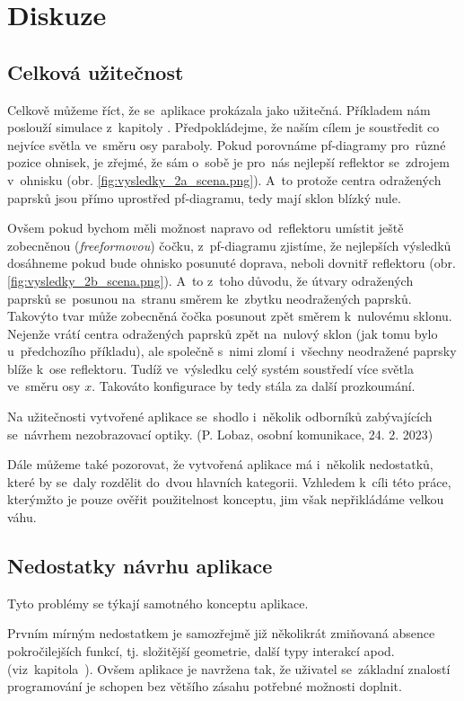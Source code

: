 \chapter{Diskuze}

\section{Celková užitečnost}

Celkově můžeme říct, že se~aplikace prokázala jako užitečná. Příkladem nám poslouží simulace z~kapitoly . Předpokládejme, že naším cílem je soustředit co nejvíce světla ve~směru osy paraboly. Pokud porovnáme pf-diagramy pro~rů\-zné pozice ohnisek, je zřejmé, že sám o~sobě je pro~nás nejlepší reflektor se~zdrojem v~ohnisku (obr. \ref{fig:vysledky_2a_scena.png}). A~to protože centra odražených paprsků jsou přímo uprostřed pf-diagramu, tedy mají sklon blízký nule.

Ovšem pokud bychom měli možnost napravo od~reflektoru umístit ještě zobecněnou (\emph{freeformovou}) čočku, z~pf-diagramu zjistíme, že nejlepších výsledků dosáhneme pokud bude ohnisko posunuté doprava, neboli dovnitř reflektoru (obr. \ref{fig:vysledky_2b_scena.png}). A~to z~toho důvodu, že útvary odražených paprsků se~posunou na~stranu směrem ke~zbytku neodražených paprsků. Takovýto tvar může zobecněná čočka posunout zpět směrem k~nulovému sklonu. Nejenže vrátí centra odražených paprsků zpět na~nulový sklon (jak tomu bylo u~předchozího příkladu), ale společně s~nimi zlomí i~všechny neodražené paprsky blíže k~ose reflektoru. Tudíž ve~výsledku celý systém soustředí více světla ve~směru osy $x$. Takováto konfigurace by tedy stála za další prozkoumání.

Na užitečnosti vytvořené aplikace se~shodlo i~několik odborníků zabývajících se~návrhem nezobrazovací optiky. (P. Lobaz, osobní komunikace, 24. 2. 2023)

Dále můžeme také pozorovat, že vytvořená aplikace má i~několik nedostatků, které by se~daly rozdělit do~dvou hlavních kategorii. Vzhledem k~cíli této práce, kterýmžto je pouze ověřit použitelnost konceptu, jim však nepřikládáme velkou váhu.

\section{Nedostatky návrhu aplikace}

Tyto problémy se týkají samotného konceptu aplikace.

Prvním mírným nedostatkem je samozřejmě již několikrát zmiňovaná absence pokročilejších funkcí, tj. složitější geometrie, další typy interakcí apod. (viz~kapitola~). Ovšem aplikace je navržena tak, že uživatel se~základní znalostí programování je schopen bez většího zásahu potřebné možnosti doplnit.

